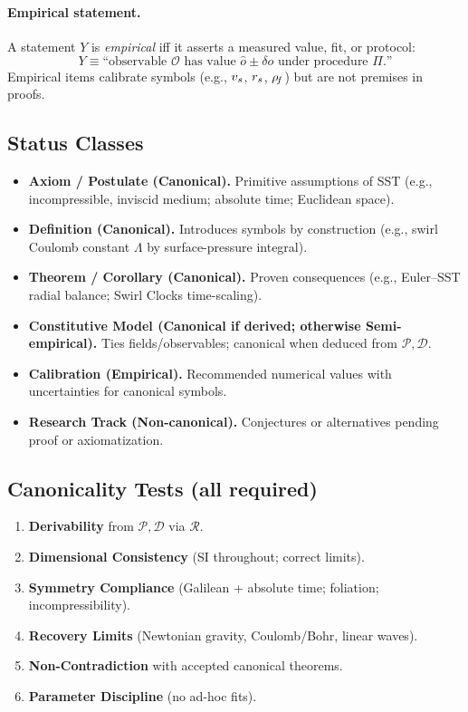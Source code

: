 \documentclass[11pt]{article}
\begin{document}
    \paragraph{Empirical statement.}
    A statement \(Y\) is \emph{empirical} iff it asserts a measured value, fit, or protocol:
    \[
        Y \equiv \text{“observable } \mathcal{O} \text{ has value } \hat{o} \pm \delta o \text{ under procedure } \Pi\text{.”}
    \]
    Empirical items calibrate symbols (e.g., $v_s$, $r_s$, $\rho_{\!f}$) but are not premises in proofs.

    \subsection*{Status Classes}
    \begin{itemize}
        \item \textbf{Axiom / Postulate (Canonical).} Primitive assumptions of SST (e.g., incompressible, inviscid medium; absolute time; Euclidean space).
        \item \textbf{Definition (Canonical).} Introduces symbols by construction (e.g., swirl Coulomb constant \(\Lambda\) by surface-pressure integral).
        \item \textbf{Theorem / Corollary (Canonical).} Proven consequences (e.g., Euler–SST radial balance; Swirl Clocks time-scaling).
        \item \textbf{Constitutive Model (Canonical if derived; otherwise Semi-empirical).} Ties fields/observables; canonical when deduced from \(\mathcal{P},\mathcal{D}\).
        \item \textbf{Calibration (Empirical).} Recommended numerical values with uncertainties for canonical symbols.
        \item \textbf{Research Track (Non-canonical).} Conjectures or alternatives pending proof or axiomatization.
    \end{itemize}

    \subsection*{Canonicality Tests (all required)}
    \begin{enumerate}
        \item \textbf{Derivability} from \(\mathcal{P},\mathcal{D}\) via \(\mathcal{R}\).
        \item \textbf{Dimensional Consistency} (SI throughout; correct limits).
        \item \textbf{Symmetry Compliance} (Galilean + absolute time; foliation; incompressibility).
        \item \textbf{Recovery Limits} (Newtonian gravity, Coulomb/Bohr, linear waves).
        \item \textbf{Non-Contradiction} with accepted canonical theorems.
        \item \textbf{Parameter Discipline} (no ad-hoc fits).
    \end{enumerate}
\end{document}
